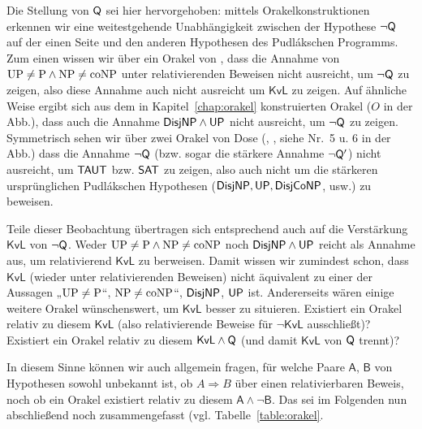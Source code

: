 Die Stellung von $\mathsf{Q}$ sei hier hervorgehoben: mittels Orakelkonstruktionen erkennen wir eine weitestgehende Unabhängigkeit zwischen der Hypothese $\neg\mathsf{Q}$ auf der einen Seite und den anderen Hypothesen des Pudlákschen Programms. Zum einen wissen wir über ein Orakel von \textcite[Thm.~12.3, Nr.~8 in der Abb.]{fenner_inverting_2003}, dass die Annahme von $\mathrm{UP}\neq\mathrm{P}\land \mathrm{NP}\neq\mathrm{coNP}$ unter relativierenden Beweisen nicht ausreicht, um $\neg\mathsf{Q}$ zu zeigen, also diese Annahme auch nicht ausreicht um $\mathsf{KvL}$ zu zeigen.
Auf ähnliche Weise ergibt sich aus dem in Kapitel~\ref{chap:orakel} konstruierten Orakel ($O$ in der Abb.), dass auch die Annahme $\mathsf{DisjNP}\land\mathsf{UP}$ nicht ausreicht, um $\neg\mathsf{Q}$ zu zeigen.
Symmetrisch sehen wir über zwei Orakel von Dose (\cite*[Cor.~3.3]{dose_oracle_2020}, \cite*[Thm.~3.2]{dose_further_2020}, siehe Nr.~5 u. 6 in der Abb.) dass die Annahme $\neg\mathsf{Q}$ (bzw. sogar die stärkere Annahme $\neg\mathsf{Q}'$) nicht ausreicht, um $\mathsf{TAUT}$ bzw. $\mathsf{SAT}$ zu zeigen, also auch nicht um die stärkeren ursprünglichen Pudlákschen Hypothesen ($\mathsf{DisjNP}, \mathsf{UP}, \mathsf{DisjCoNP}$, usw.) zu beweisen.

Teile dieser Beobachtung übertragen sich entsprechend auch auf die Verstärkung $\mathsf{KvL}$ von $\neg\mathsf{Q}$. Weder $\mathrm{UP}\neq\mathrm{P}\land \mathrm{NP}\neq\mathrm{coNP}$ noch $\mathsf{DisjNP}\land\mathsf{UP}$ reicht als Annahme aus, um relativierend $\mathsf{KvL}$ zu berweisen.
Damit wissen wir zumindest schon, dass $\mathsf{KvL}$ (wieder unter relativierenden Beweisen) nicht äquivalent zu einer der Aussagen „$\mathrm{UP}\neq \mathrm{P}$“, $\mathrm{NP}\neq\mathrm{coNP}$“, $\mathsf{DisjNP}$, $\mathsf{UP}$ ist.
Andererseits wären einige weitere Orakel wünschenswert, um $\mathsf{KvL}$ besser zu situieren. Existiert ein Orakel relativ zu diesem $\mathsf{KvL}$ (also relativierende Beweise für $\neg\mathsf{KvL}$ ausschließt)? Existiert ein Orakel relativ zu diesem $\mathsf{KvL}\land \mathsf{Q}$ (und damit $\mathsf{KvL}$ von $\mathsf{Q}$ trennt)? 

In diesem Sinne können wir auch allgemein fragen, für welche Paare $\mathsf{A}$, $\mathsf{B}$ von Hypothesen sowohl unbekannt ist, ob $A\Rightarrow B$ über einen relativierbaren Beweis, noch ob ein Orakel existiert relativ zu diesem $\mathsf{A\land \neg B}$.
Das sei im Folgenden nun abschließend noch zusammengefasst (vgl. Tabelle~\ref{table:orakel}.

